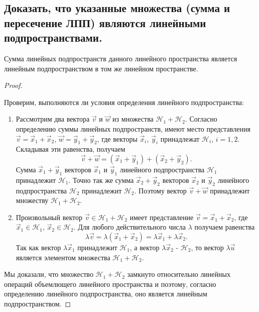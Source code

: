 \subsection{
    Доказать, что указанные множества (сумма и пересечение ЛПП) являются линейными подпространствами.
}

\begin{theorem}
    Сумма линейных подпространств данного линейного пространства является линейным подпространством в том же линейном пространстве.
\end{theorem}

\begin{proof}~

    Проверим, выполняются ли условия определения линейного подпространства:
    \begin{enumerate}[nosep]
        \item Рассмотрим два вектора $\vec{v}$ и $\vec{w}$ из множества $\mathcal{H}_1 + \mathcal{H}_2$. Согласно определению суммы линейных подпространств, имеют место представления $\vec{v} = \vec{x}_1 + \vec{x}_2$, $\vec{w} = \vec{y}_1 + \vec{y}_2$, где векторы $\vec{x}_i$, $\vec{y}_i$ принадлежат $\mathcal{H}_i$, $i = 1, 2$. Складывая эти равенства, получаем
        $$\vec{v} + \vec{w} = (\vec{x}_1 + \vec{y}_1) + (\vec{x}_2 + \vec{y}_2).$$
        Сумма $\vec{x}_1 + \vec{y}_1$ векторов $\vec{x}_1$ и $\vec{y}_1$ линейного подпространства $\mathcal{H}_1$ принадлежит $\mathcal{H}_1$. Точно так же сумма $\vec{x}_2 + \vec{y}_2$ векторов $\vec{x}_2$ и $\vec{y}_2$ линейного подпространства $\mathcal{H}_2$ принадлежит $\mathcal{H}_2$. Поэтому вектор $\vec{v} + \vec{w}$ принадлежит множеству $\mathcal{H}_1 + \mathcal{H}_2$.
        \item Произвольный вектор $\vec{v} \in \mathcal{H}_1 + \mathcal{H}_2$ имеет представление $\vec{v} = \vec{x}_1 + \vec{x}_2$, где $\vec{x}_1 \in \mathcal{H}_1$, $\vec{x}_2 \in \mathcal{H}_2$. Для любого действительного числа $\lambda$ получаем равенства 
        $$\lambda \vec{v} = \lambda (\vec{x}_1 + \vec{x}_2) = \lambda \vec{x}_1 + \lambda \vec{x}_2.$$
        Так как вектор $\lambda \vec{x}_1$ принадлежит $\mathcal{H}_1$, а вектор $\lambda \vec{x}_2$ - $\mathcal{H}_2$, то вектор $\lambda \vec{u}$ является элементом множества $\mathcal{H}_1 + \mathcal{H}_2$.
    \end{enumerate}
    Мы доказали, что множество $\mathcal{H}_1 + \mathcal{H}_2$ замкнуто относительно линейных операций объемлющего линейного пространства и поэтому, согласно определению линейного подпространства, оно является линейным подпространством.
\end{proof}

